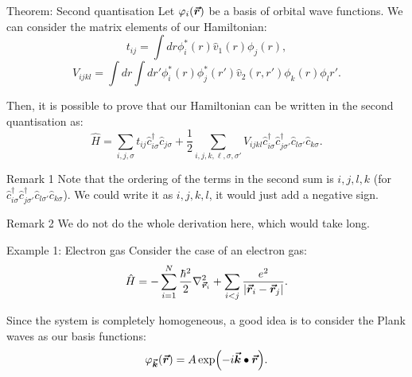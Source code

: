 \documentclass[a4paper]{article}
\begin{document}
\begin{parag}{Theorem: Second quantisation}
    Let $\phi_i\left(\bvec{r}\right)$ be a basis of orbital wave functions. We can consider the matrix elements of our Hamiltonian:
    \[t_{ij} = \int dr \phi_i^*\left(r\right) \hat{v}_1\left(r\right) \phi_j\left(r\right),\]
    \[V_{ijkl} = \int dr \int dr' \phi_i^*\left(r\right) \phi_j^*\left(r'\right) \hat{v}_2\left(r, r'\right) \phi_k\left(r\right) \phi_{l} r'.\]
    
    Then, it is possible to prove that our Hamiltonian can be written in the second quantisation as:
    \[\hat{H} = \sum_{i, j, \sigma} t_{ij} \hat{c}_{i \sigma}^{\dagger} \hat{c}_{j \sigma} + \frac{1}{2} \sum_{i, j, k, \ell, \sigma, \sigma'} V_{ijk l} \hat{c}_{i \sigma}^{\dagger} \hat{c}_{j \sigma'}^{\dagger} \hat{c}_{l \sigma'} \hat{c}_{k \sigma}.\]

    \begin{subparag}{Remark 1}
        Note that the ordering of the terms in the second sum is $i, j, l, k$ (for $\hat{c}_{i \sigma}^{\dagger} \hat{c}_{j \sigma'}^{\dagger} \hat{c}_{l \sigma'} \hat{c}_{k \sigma}$). We could write it as $i, j, k, l$, it would just add a negative sign.
    \end{subparag}

    \begin{subparag}{Remark 2}
         We do not do the whole derivation here, which would take long.
    \end{subparag}
\end{parag}

\begin{parag}{Example 1: Electron gas}
    Consider the case of an electron gas: 
    \[\hat{H} = - \sum_{i=1}^{N} \frac{\hbar^2}{2} \nabla^2_{\bvec{r}_i} + \sum_{i < j} \frac{e^2}{\left|\bvec{r}_i - \bvec{r}_j\right|}.\]

    Since the system is completely homogeneous, a good idea is to consider the Plank waves as our basis functions: 
    \[\phi_{\bvec{k}}\left(\bvec{r}\right) = A \exp\left(-i \bvec{k}\dotprod \bvec{r}\right).\]
\end{parag}
\end{document}
